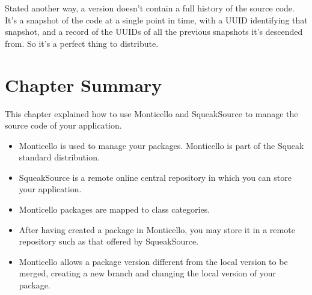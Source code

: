 \documentclass[a4paper,10pt,twoside]{book}
\begin{document}
Stated another way, a version doesn't contain a full history of the source code. It's a snapshot of the code at a single point in time, with a UUID identifying that snapshot, and a record of the UUIDs of all the previous snapshots it's descended from. So it's a perfect thing to distribute.

\section{Chapter Summary}

This chapter explained how to use Monticello and SqueakSource to manage the source code of your application.

\begin{itemize}
\item Monticello is used to manage your packages. Monticello is part of the Squeak standard distribution.

\item SqueakSource is a remote online central repository in which you can store your application.

\item Monticello packages are mapped to class categories. 

\item After having created a package in Monticello, you may store it in a remote repository such as that offered by SqueakSource.

\item Monticello allows a package version different from the local version to be merged, creating a new branch and changing the local version of your package.
\end{itemize}



\end{document}
